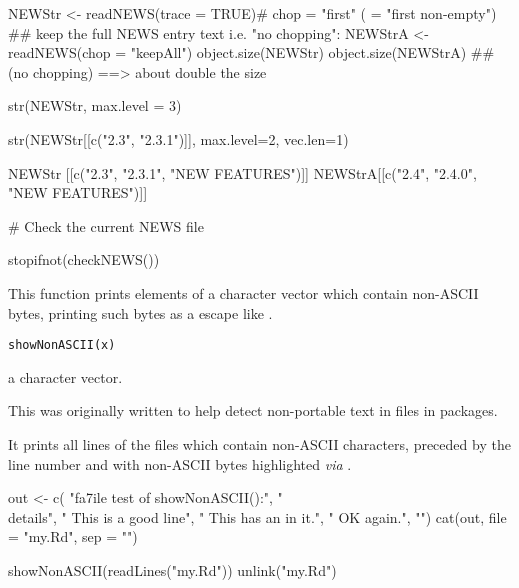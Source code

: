 %
\begin{Examples}
\begin{ExampleCode}
NEWStr  <- readNEWS(trace = TRUE)# chop = "first" ( = "first non-empty")
## keep the full NEWS entry text i.e. "no chopping":
NEWStrA <- readNEWS(chop = "keepAll")
object.size(NEWStr)
object.size(NEWStrA) ## (no chopping) ==> about double the size

str(NEWStr, max.level = 3)

str(NEWStr[[c("2.3", "2.3.1")]], max.level=2, vec.len=1)

NEWStr [[c("2.3", "2.3.1", "NEW FEATURES")]]
NEWStrA[[c("2.4", "2.4.0", "NEW FEATURES")]]

# Check the current NEWS file

stopifnot(checkNEWS())

\end{ExampleCode}
\end{Examples}
%
\begin{Description}\relax
This function prints elements of a character vector which contain
non-ASCII bytes, printing such bytes as a escape like .
\end{Description}
%
\begin{Usage}
\begin{verbatim}
showNonASCII(x)
\end{verbatim}
\end{Usage}
%
\begin{Arguments}
\begin{ldescription}
\item[\code{x}] a character vector.
\end{ldescription}
\end{Arguments}
%
\begin{Details}\relax
This was originally written to help detect non-portable text in
files in packages.

It prints all lines of the files which contain non-ASCII characters,
preceded by the line number and with non-ASCII bytes highlighted
\emph{via} .
\end{Details}
%
\begin{Examples}
\begin{ExampleCode}
out <- c(
"fa\xE7ile test of showNonASCII():",
"\\details{",
"   This is a good line",
"   This has an \xfcmlaut in it.",
"   OK again.",
"}")
cat(out, file = "my.Rd", sep = "\n")

showNonASCII(readLines("my.Rd"))
unlink("my.Rd")
\end{ExampleCode}
\end{Examples}

